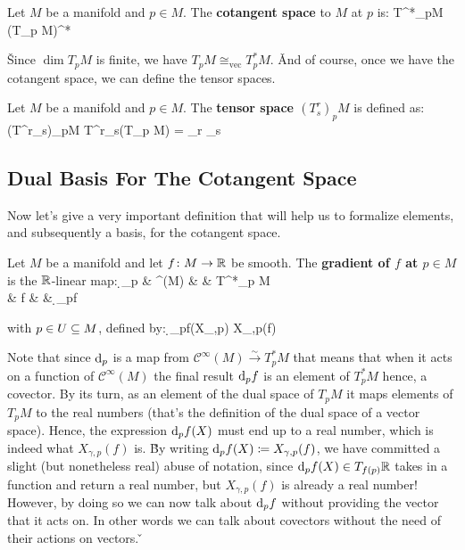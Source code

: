 Let $M$ be a manifold and $p\in M$. The \textbf{cotangent space} to $M$ at $p$ is:
\bse
T^*_pM \coloneqq (T_p M)^*
\ese
\ed

\v

Since $\dim T_p M$ is finite, we have $T_p M\cong_{\mathrm{vec}} T^*_p M$. \v

And of course, once we have the cotangent space, we can define the tensor spaces.

Let $M$ be a manifold and $p\in M$. The \textbf{tensor space $(T^r_s)_p M$} is defined as:
\bse
(T^r_s)_pM \coloneqq T^r_s(T_p M) = _{r } \otimes
{}_{s }
\ese
\ed

\subsection{Dual Basis For The Cotangent Space}

Now let's give a very important definition that will help us to formalize elements, and subsequently a basis, for the
cotangent space.

\bd [Gradient]
Let $M$ be a manifold and let $f\colon M \to\mathbb{R}$ be smooth. The \textbf{gradient of $f$ at $p\in M$} is the $\mathbb{R}$-linear map:
\d_p \cl & ^\infty(M) & \xrightarrow{\sim}& T^*_p M\\ & f & \mapsto & \d_pf
\ei

with $p\in U\subseteq M$, defined by:
\d_pf(X_{\gamma,p}) \coloneqq X_{\gamma,p}(f)
\ei
\ed

Note that since $\mathrm{d}_p$ is a map from $\mathcal{C}^\infty(M) \xrightarrow{\sim} T^*_p M$ that means that when it acts
on a function of $\mathcal{C}^\infty(M)$ the final result $\mathrm{d}_p f$ is an element of $T^*_p M$ hence, a covector. By its
turn, as an element of the dual space of $T_p M$ it maps elements of $T_p M$ to the real numbers (that's the definition
of the dual space of a vector space). Hence, the expression $\mathrm{d}_p f(X)$ must end up to a real number, which is indeed
what $X_{\gamma,p}(f)$ is. \v

By writing $\mathrm{d}_p f(X) \coloneqq X_{\gamma,p}(f)$, we have committed a slight (but nonetheless real) abuse of
notation, since $\mathrm{d}_p f(X)\in T_{f(p)}\mathbb{R}$ takes in a function and return a real number, but $X_{\gamma,p}(f)$ is
already a real number! However, by doing so we can now talk about $\mathrm{d}_p f$ without providing the vector that it acts
on. In other words we can talk about covectors without the need of their actions on vectors. \v

